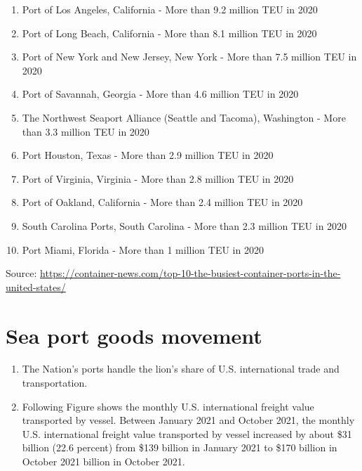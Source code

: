\documentclass[
]{book}
\providecommand{\tightlist}{%
  \setlength{\itemsep}{0pt}\setlength{\parskip}{0pt}}
\begin{document}
\begin{enumerate}
\def\labelenumi{\alph{enumi})}
\tightlist
\item
  Port of Los Angeles, California - More than 9.2 million TEU in 2020
\item
  Port of Long Beach, California - More than 8.1 million TEU in 2020
\item
  Port of New York and New Jersey, New York - More than 7.5 million TEU in 2020
\item
  Port of Savannah, Georgia - More than 4.6 million TEU in 2020
\item
  The Northwest Seaport Alliance (Seattle and Tacoma), Washington - More than 3.3 million TEU in 2020
\item
  Port Houston, Texas - More than 2.9 million TEU in 2020
\item
  Port of Virginia, Virginia - More than 2.8 million TEU in 2020
\item
  Port of Oakland, California - More than 2.4 million TEU in 2020
\item
  South Carolina Ports, South Carolina - More than 2.3 million TEU in 2020
\item
  Port Miami, Florida - More than 1 million TEU in 2020
\end{enumerate}

Source: \url{https://container-news.com/top-10-the-busiest-container-ports-in-the-united-states/}

\hypertarget{intro-Seaport_goods}{%
\section{Sea port goods movement}\label{intro-Seaport_goods}}

\begin{enumerate}
\def\labelenumi{\arabic{enumi})}
\item
  The Nation's ports handle the lion's share of U.S. international trade and transportation.
\item
  Following Figure shows the monthly U.S. international freight value transported by vessel. Between January 2021 and October 2021, the monthly U.S. international freight value transported by vessel increased by about \$31 billion (22.6 percent) from \$139 billion in January 2021 to \$170 billion in October 2021 billion in October 2021.
\end{enumerate}
\end{document}
